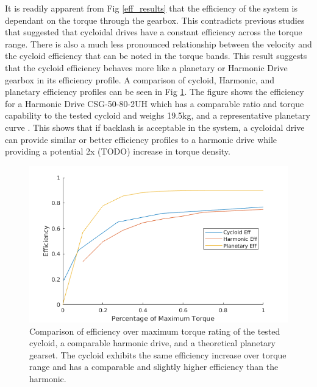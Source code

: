 \documentclass[letterpaper, 10 pt, conference]{ieeeconf}  %
\begin{document}
It is readily apparent from Fig \ref{eff_results} that the efficiency of the system is dependant on the torque through the gearbox. This contradicts previous studies that suggested that cycloidal drives have a constant efficiency across the torque range. There is also a much less pronounced relationship between the velocity and the cycloid efficiency that can be noted in the torque bands. This result suggests that the cycloid efficiency behaves more like a planetary or Harmonic Drive gearbox in its efficiency profile. A comparison of cycloid, Harmonic, and planetary efficiency profiles can be seen in Fig \ref{eff_comp}. The figure shows the efficiency for a Harmonic Drive CSG-50-80-2UH \cite{harmonic_sheet} which has a comparable ratio and torque capability to the tested cycloid and weighs 19.5kg, and a representative planetary curve \cite{planetary}. This shows that if backlash is acceptable in the system, a cycloidal drive can provide similar or better efficiency profiles to a harmonic drive while providing a potential 2x (TODO) increase in torque density.

   \begin{figure}[!b]
      \centering
      \includegraphics[width=\linewidth]{eff_comp_v2}
      \caption{Comparison of efficiency over maximum torque rating of the tested cycloid, a comparable harmonic drive, and a theoretical planetary gearset. The cycloid exhibits the same efficiency increase over torque range and has a comparable and slightly higher efficiency than the harmonic.}
      \label{eff_comp}
   \end{figure}
   
\end{document}
